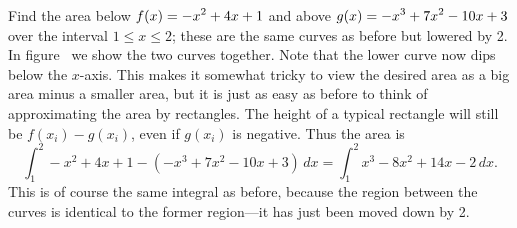 
\begin{example} Find the area below $\displaystyle f(x)= -x^2+4x+1$ and above
$\displaystyle g(x)=-x^3+7x^2-10x+3$ over the interval $1\le x\le2$; these are the
same curves as before but lowered by 2. In
figure~ we show the two curves
together. Note that the lower curve now dips below the $x$-axis. This
makes it somewhat tricky to view the desired area as a big area minus
a smaller area, but it is just as easy as before to think of
approximating the area by rectangles. The height of a typical
rectangle will still be $f(x_i)-g(x_i)$, even if $g(x_i)$ is
negative. Thus the area is 
$$
  \int_1^2 -x^2+4x+1-(-x^3+7x^2-10x+3)\,dx
  =\int_1^2 x^3-8x^2+14x-2\,dx.
$$
This is of course the same integral as before, because the region
between the curves is identical to the former region---it has just
been moved down by 2.
\end{example}

